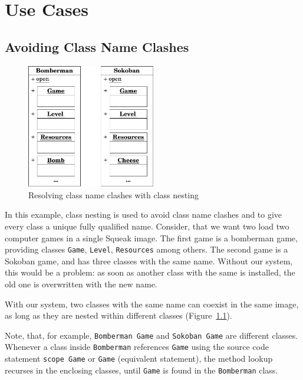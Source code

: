 \chapter{Use Cases}
\label{sec:usecases}

\section{Avoiding Class Name Clashes}
\begin{figure}
	\includegraphics[width=0.5\textwidth]{usecase_class_clash.pdf}
	\centering
	\caption{Resolving class name clashes with class nesting}
	\label{fig:use_class_clash}
\end{figure}

In this example, class nesting is used to avoid class name clashes and to give every class a unique fully qualified name. Consider, that we want two load two computer games in a single Squeak image. The first game is a bomberman game, providing classes \texttt{Game}, \texttt{Level}, \texttt{Resources} among others. The second game is a Sokoban game, and has three classes with the same name. Without our system, this would be a problem: as soon as another class with the same is installed, the old one is overwritten with the new name.

With our system, two classes with the same name can coexist in the same image, as long as they are nested within different classes (Figure~\ref{fig:use_class_clash}).

Note, that, for example, \texttt{Bomberman Game} and \texttt{Sokoban Game} are different classes. Whenever a class inside \texttt{Bomberman} references \texttt{Game} using the source code statement \texttt{scope Game} or \texttt{Game} (equivalent statement), the method lookup recurses in the enclosing classes, until \texttt{Game} is found in the \texttt{Bomberman} class.

